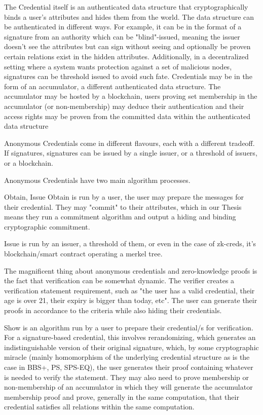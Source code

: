 The Credential itself is an authenticated data structure that cryptographically binds a user's attributes and hides them from the world. The data structure can be authenticated in different ways. For example, it can be in the format of a signature from an authority which can be "blind"-issued, meaning the issuer doesn't see the attributes but can sign without seeing and optionally be proven certain relations exist in the hidden attributes. Additionally, in a decentralized setting where a system wants protection against a set of malicious nodes, signatures can be threshold issued to avoid such fate.
Credentials may be in the form of an accumulator, a different authenticated data structure. The accumulator may be hosted by a blockchain, users proving set membership in the accumulator (or non-membership) may deduce their authentication and their access rights may be proven from the committed data within the authenticated data structure

Anonymous Credentials come in different flavours, each with a different tradeoff. If signatures, signatures can be issued by a single issuer, or a threshold of issuers, or a blockchain. 



Anonymous Credentials have two main algorithm processes.

Obtain, Issue
Obtain is run by a user, the user may prepare the messages for their credential. They may "commit" to their attributes, which in our Thesis means they run a commitment algorithm and output a hiding and binding cryptographic commitment. 

Issue is run by an issuer, a threshold of them, or even in the case of zk-creds, it's blockchain/smart contract operating a merkel tree.


The magnificent thing about anonymous credentials and zero-knowledge proofs is the fact that verification can be somewhat dynamic. The verifier creates a verification statement requirement, such as "the user has a valid credential, their age is over 21, their expiry is bigger than today, etc". The user can generate their proofs in accordance to the criteria while also hiding their credentials. 

Show is an algorithm run by a user to prepare their credential/s for verification. For a signature-based credential, this involves rerandomizing, which generates an indistinguishable version of their original signature, which, by some cryptographic miracle (mainly homomorphism of the underlying credential structure as is the case in BBS+, PS, SPS-EQ), the user generates their proof containing whatever is needed to verify the statement. They may also need to prove membership or non-membership of an accumulator in which they will generate the accumulator membership proof and prove, generally in the same computation, that their credential satisfies all relations within the same computation. 

